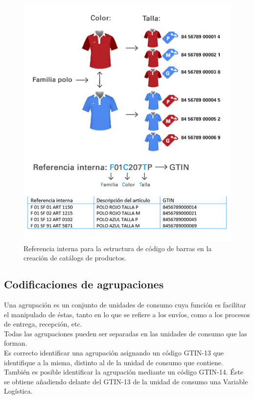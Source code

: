 \begin{figure}
  \centering
    \includegraphics[scale=0.5]{./Capitulo2/figs/catalogo_post_barras.jpg}
  \caption{Referencia interna para la estructura de código de barras en la creación de catálogs de productos.}
  \label{catalogo_post_barras}
\end{figure}

\subsection{Codificaciones de agrupaciones}

Una agrupación es un conjunto de unidades de consumo cuya función es facilitar el manipulado de éstas, tanto en lo que se refiere a los envíos, como a los procesos de entrega, recepción, etc.\\

Todas las agrupaciones pueden ser separadas en las unidades de consumo que las forman.\\

Es correcto identificar una agrupación asignando un código GTIN-13 que identifique a la misma, distinto al de la unidad de consumo que contiene.\\

También es posible identificar la agrupación mediante un código GTIN-14. Éste se obtiene añadiendo delante del GTIN-13 de la unidad de consumo una Variable Logística.\

